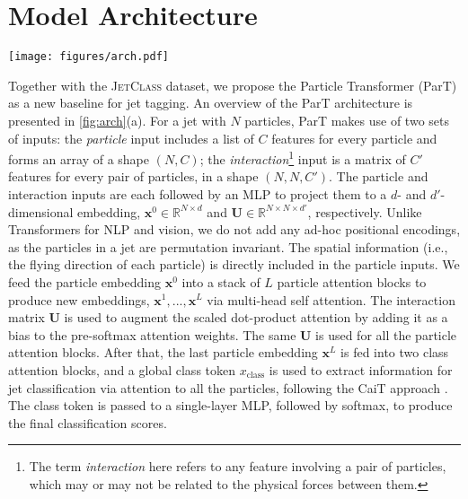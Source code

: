 \documentclass[nohyperref]{article}
\theoremstyle{plain}
\theoremstyle{definition}
\theoremstyle{remark}
\newcommand{\jetclass}{{\textsc{JetClass}}\xspace}
\begin{document}
\section{Model Architecture}
\label{sec:arch}

\begin{figure*}[t]
\begin{center}
\centerline{\texttt{[image: figures/arch.pdf]}}
\vskip -0.2in
\caption{The architecture of (a) Particle Transformer (b) Particle Attention Block (c) Class Attention Block.}
\label{fig:arch}
\end{center}
\vskip -0.4in
\end{figure*}

Together with the \jetclass dataset, we propose the Particle Transformer (ParT) as a new baseline for jet tagging. An overview of the ParT architecture is presented in \cref{fig:arch}(a). For a jet with $N$ particles, ParT makes use of two sets of inputs: the \textit{particle} input includes a list of $C$ features for every particle and forms an array of a shape $(N, C)$; the \textit{interaction}\footnote{The term \textit{interaction} here refers to any feature involving a pair of particles, which may or may not be related to the physical forces between them.} input is a matrix of $C'$ features for every pair of particles, in a shape $(N, N, C')$. The particle and interaction inputs are each followed by an MLP to project them to a $d$- and $d'$-dimensional embedding, $\mathbf{x}^{0}\in\mathbb{R}^{N \times d}$ and $\mathbf{U}\in\mathbb{R}^{N \times N \times d'}$, respectively. Unlike Transformers for NLP and vision, we do not add any ad-hoc positional encodings, as the particles in a jet are permutation invariant. The spatial information (i.e., the flying direction of each particle) is directly included in the particle inputs. 
We feed the particle embedding $\mathbf{x}^{0}$ into a stack of $L$ particle attention blocks to produce new embeddings, $\mathbf{x}^{1}, ..., \mathbf{x}^{L}$ via multi-head self attention. The interaction matrix $\mathbf{U}$ is used to augment the scaled dot-product attention by adding it as a bias to the pre-softmax attention weights. The same $\mathbf{U}$ is used for all the particle attention blocks. After that, the last particle embedding $\mathbf{x}^{L}$ is fed into two class attention blocks, and a global class token $x_{\text{class}}$ is used to extract information for jet classification via attention to all the particles, following the CaiT approach \cite{Touvron_2021_ICCV}. The class token is passed to a single-layer MLP, followed by softmax, to produce the final classification scores. 
\end{document}
